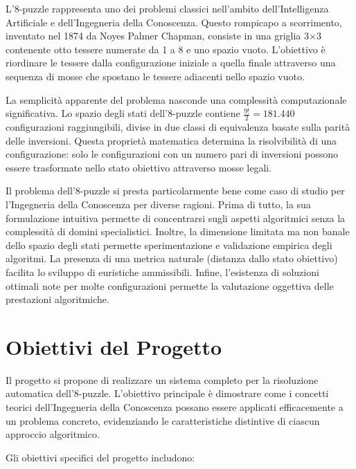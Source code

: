 \documentclass[12pt,a4paper]{report}
\theoremstyle{definition}
\begin{document}
L'8-puzzle rappresenta uno dei problemi classici nell'ambito dell'Intelligenza Artificiale e dell'Ingegneria della Conoscenza. Questo rompicapo a scorrimento, inventato nel 1874 da Noyes Palmer Chapman, consiste in una griglia 3×3 contenente otto tessere numerate da 1 a 8 e uno spazio vuoto. L'obiettivo è riordinare le tessere dalla configurazione iniziale a quella finale attraverso una sequenza di mosse che spostano le tessere adiacenti nello spazio vuoto.

La semplicità apparente del problema nasconde una complessità computazionale significativa. Lo spazio degli stati dell'8-puzzle contiene $\frac{9!}{2} = 181.440$ configurazioni raggiungibili, divise in due classi di equivalenza basate sulla parità delle inversioni. Questa proprietà matematica determina la risolvibilità di una configurazione: solo le configurazioni con un numero pari di inversioni possono essere trasformate nello stato obiettivo attraverso mosse legali.

Il problema dell'8-puzzle si presta particolarmente bene come caso di studio per l'Ingegneria della Conoscenza per diverse ragioni. Prima di tutto, la sua formulazione intuitiva permette di concentrarsi sugli aspetti algoritmici senza la complessità di domini specialistici. Inoltre, la dimensione limitata ma non banale dello spazio degli stati permette sperimentazione e validazione empirica degli algoritmi. La presenza di una metrica naturale (distanza dallo stato obiettivo) facilita lo sviluppo di euristiche ammissibili. Infine, l'esistenza di soluzioni ottimali note per molte configurazioni permette la valutazione oggettiva delle prestazioni algoritmiche.

\section{Obiettivi del Progetto}

Il progetto si propone di realizzare un sistema completo per la risoluzione automatica dell'8-puzzle. L'obiettivo principale è dimostrare come i concetti teorici dell'Ingegneria della Conoscenza possano essere applicati efficacemente a un problema concreto, evidenziando le caratteristiche distintive di ciascun approccio algoritmico.

Gli obiettivi specifici del progetto includono:
\end{document}

